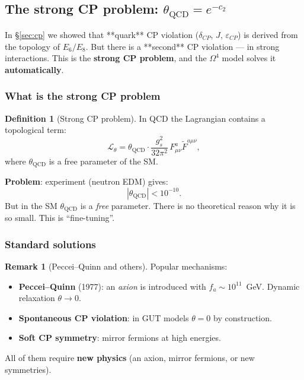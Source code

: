 \documentclass[11pt,a4paper]{article}
\newcommand{\Om}{\Omega^4}
\theoremstyle{definition}
\newtheorem{definition}[theorem]{Definition}
\newtheorem{remark}[theorem]{Remark}
\begin{document}
\subsection{The strong CP problem: $\theta_{\text{QCD}} = e^{-c_2}$}
\label{subsec:strong-cp-review}

In §\ref{sec:cp} we showed that **quark** CP violation ($\delta_{CP}$,
$J$, $\varepsilon_{CP}$) is derived from the topology of $E_6/E_8$. But there is
a **second** CP violation — in strong interactions. This is the
\textbf{strong CP problem}, and the $\Om$ model solves it
\textbf{automatically}.

\subsubsection{What is the strong CP problem}

\begin{definition}[Strong CP problem]
\label{def:strong-cp-review}
In QCD the Lagrangian contains a topological term:
\begin{equation}
    \mathcal{L}_{\theta} = \theta_{\text{QCD}} \cdot
    \frac{g_s^2}{32\pi^2} \, F_{\mu\nu}^a \tilde{F}^{a\mu\nu},
    \label{eq:theta-term-review}
\end{equation}
where $\theta_{\text{QCD}}$ is a free parameter of the SM.

\medskip\noindent
\textbf{Problem}: experiment (neutron EDM) gives:
\begin{equation}
    |\theta_{\text{QCD}}| < 10^{-10}.
\end{equation}
But in the SM $\theta_{\text{QCD}}$ is a \emph{free} parameter. There is no
theoretical reason why it is so small. This is ``fine-tuning''.
\end{definition}

\subsubsection{Standard solutions}

\begin{remark}[Peccei--Quinn and others]
\label{rem:pq-review}
Popular mechanisms:
\begin{itemize}
    \item \textbf{Peccei--Quinn} (1977): an \emph{axion} is introduced
          with $f_a \sim 10^{11}$~GeV. Dynamic relaxation
          $\theta \to 0$.
    \item \textbf{Spontaneous CP violation}: in GUT models
          $\theta = 0$ by construction.
    \item \textbf{Soft CP symmetry}: mirror fermions
          at high energies.
\end{itemize}
All of them require \textbf{new physics} (an axion, mirror fermions,
or new symmetries).
\end{remark}
\end{document}
